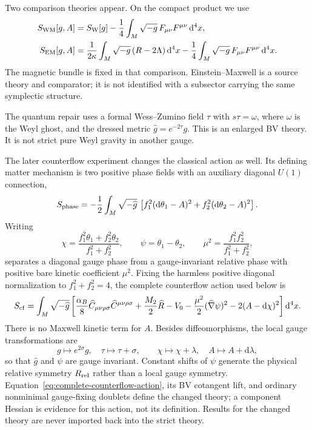 \documentclass[11pt]{article}
\newcommand{\dd}{\mathrm d}
\begin{document}
Two comparison theories appear.  On the compact product we use
\begin{align}
 S_{\rm WM}[g,A]
 &=S_{\rm W}[g]-\frac14\int_M\sqrt{-g}\,F_{\mu\nu}F^{\mu\nu}\,\dd^4x,
 \\
 S_{\rm EM}[g,A]
 &=\frac1{2\kappa}\int_M\sqrt{-g}\,(R-2\Lambda)\,\dd^4x
   -\frac14\int_M\sqrt{-g}\,F_{\mu\nu}F^{\mu\nu}\,\dd^4x.
\end{align}
The magnetic bundle is fixed in that comparison.  Einstein--Maxwell is a
source theory and comparator; it is not identified with a subsector carrying
the same symplectic structure.

The quantum repair uses a formal Wess--Zumino field $\tau$ with
\(
s\tau=\omega
\), where $\omega$ is the Weyl ghost, and the dressed metric
\(
\widehat g=e^{-2\tau}g
\).
This is an enlarged BV theory.  It is not strict pure Weyl gravity in another
gauge.

The later counterflow experiment changes the classical action as well.  Its
defining matter mechanism is two positive phase fields with an auxiliary
diagonal $U(1)$ connection,
\begin{equation}
 S_{\rm phase}
 =-\frac12\int_M\sqrt{-\widehat g}\,
 \left[f_1^2(\dd\theta_1-A)^2+f_2^2(\dd\theta_2-A)^2\right].
 \label{eq:counterflow-action}
\end{equation}
Writing
\begin{equation}
 \chi=\frac{f_1^2\theta_1+f_2^2\theta_2}{f_1^2+f_2^2},
 \qquad \psi=\theta_1-\theta_2,
 \qquad
 \mu^2=\frac{f_1^2f_2^2}{f_1^2+f_2^2},
\end{equation}
separates a diagonal gauge phase from a gauge-invariant relative phase with
positive bare kinetic coefficient $\mu^2$.  Fixing the harmless positive
diagonal normalization to $f_1^2+f_2^2=4$, the complete counterflow action
used below is
\begin{equation}
 S_{\rm cf}=
 \int_M\sqrt{-\widehat g}\left[
 \frac{\alpha_B}{8}\widehat C_{\mu\nu\rho\sigma}
                         \widehat C^{\mu\nu\rho\sigma}
 +\frac{M_2}{2}\widehat R-V_0
 -\frac{\mu^2}{2}(\widehat\nabla\psi)^2
 -2(A-\dd\chi)^2\right]\dd^4x .
 \label{eq:complete-counterflow-action}
\end{equation}
There is no Maxwell kinetic term for $A$.  Besides diffeomorphisms, the local
gauge transformations are
\begin{equation}
 g\mapsto e^{2\sigma}g,
 \quad \tau\mapsto\tau+\sigma,
 \qquad
 \chi\mapsto\chi+\lambda,
 \quad A\mapsto A+\dd\lambda,
 \label{eq:counterflow-gauge}
\end{equation}
so that $\widehat g$ and $\psi$ are gauge invariant.  Constant shifts of
$\psi$ generate the physical relative symmetry $R_{\rm rel}$ rather than a
local gauge symmetry.  Equation~\eqref{eq:complete-counterflow-action}, its
BV cotangent lift, and ordinary nonminimal gauge-fixing doublets define the
changed theory; a component Hessian is evidence for this action, not its
definition.  Results for the changed theory are never imported back into the
strict theory.
\end{document}
